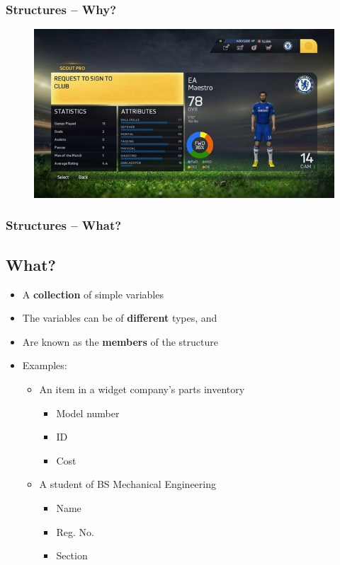 \documentclass{beamer}
\begin{document}
\begin{frame}
    \frametitle{Structures -- Why?}
    \begin{figure}
        \centering
        \includegraphics[scale=0.7]{player_select.jpg}
    \end{figure}
\end{frame}

\begin{frame}
    \frametitle{Structures -- What?}
    \subsection{What?} %
    \label{sub:what}
    \begin{itemize}
        \item A \textbf{collection} of simple variables
        \item The variables can be of \textbf{different} types, and
        \item Are known as the \textbf{members} of the structure
        \item Examples:
        \begin{itemize}
            \item An item in a widget company's parts inventory
            \begin{itemize}
                \item Model number
                \item ID
                \item Cost
            \end{itemize}
            \item A student of BS Mechanical Engineering
            \begin{itemize}
                \item Name
                \item Reg. No.
                \item Section
            \end{itemize}
        \end{itemize}
    \end{itemize}
\end{frame}
\end{document}
